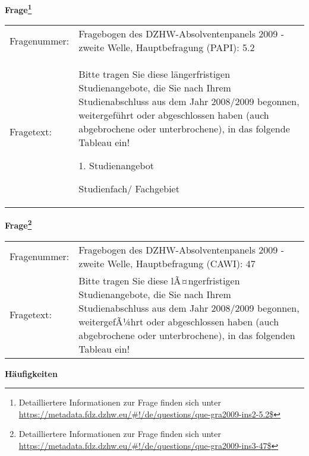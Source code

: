 				\vspace*{0.5cm}
                \noindent\textbf{Frage\footnote{Detailliertere Informationen zur Frage finden sich unter
		              \url{https://metadata.fdz.dzhw.eu/\#!/de/questions/que-gra2009-ins2-5.2$}}}\\
				\begin{tabularx}{\hsize}{@{}lX}
					Fragenummer: &
					  Fragebogen des DZHW-Absolventenpanels 2009 - zweite Welle, Hauptbefragung (PAPI):
					  5.2
 \\
					Fragetext: & Bitte tragen Sie diese längerfristigen Studienangebote, die Sie nach Ihrem Studienabschluss aus dem Jahr 2008/2009 begonnen, weitergeführt oder abgeschlossen haben (auch abgebrochene oder unterbrochene), in das folgende Tableau ein!\par  1. Studienangebot\par  Studienfach/ Fachgebiet \\
				\end{tabularx}
				\vspace*{0.5cm}
                \noindent\textbf{Frage\footnote{Detailliertere Informationen zur Frage finden sich unter
		              \url{https://metadata.fdz.dzhw.eu/\#!/de/questions/que-gra2009-ins3-47$}}}\\
				\begin{tabularx}{\hsize}{@{}lX}
					Fragenummer: &
					  Fragebogen des DZHW-Absolventenpanels 2009 - zweite Welle, Hauptbefragung (CAWI):
					  47
 \\
					Fragetext: & Bitte tragen Sie diese lÃ¤ngerfristigen Studienangebote, die Sie nach Ihrem Studienabschluss aus dem Jahr 2008/2009 begonnen, weitergefÃ¼hrt oder abgeschlossen haben (auch abgebrochene oder unterbrochene), in das folgenden Tableau ein! \\
				\end{tabularx}





        		\vspace*{0.5cm}
                \noindent\textbf{Häufigkeiten}

